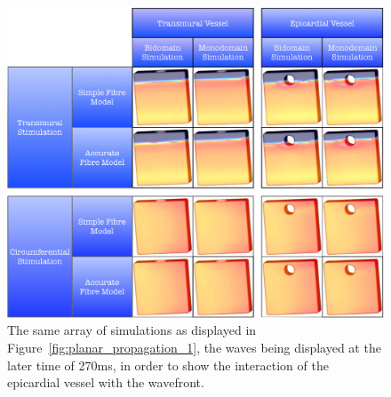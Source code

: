     \begin{figure}[htbp]
  		\centering
  	    \includegraphics[width=1\textwidth]{Ch4/Figs/planar_propagation_2}
              \caption{The same array of simulations as displayed in Figure~\ref{fig:planar_propagation_1}, the waves being displayed at the later time of 270ms, in order to show the interaction of the epicardial vessel with the wavefront.}
  	  \label{fig:planar_propagation_2}
  	\end{figure}

